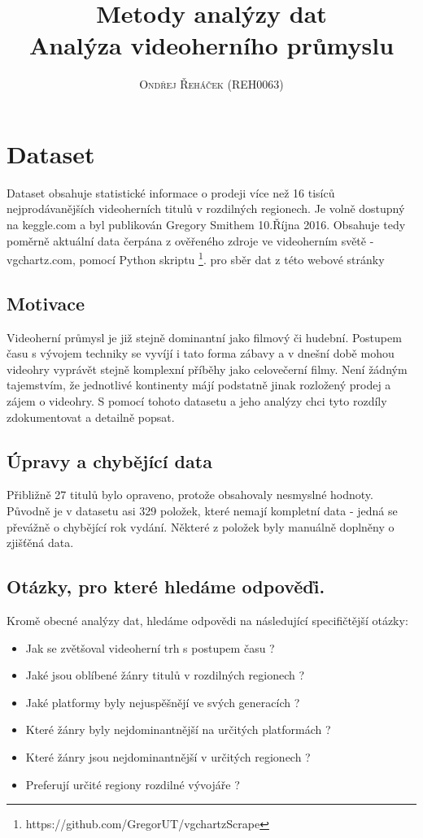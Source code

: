 \documentclass[a4paper,11pt]{article}
\title{\Huge \textbf{Metody analýzy dat}  
\\ \huge Analýza videoherního průmyslu }
\author{\textsc{Ondřej Řeháček (REH0063)}}
\begin{document}
\maketitle

\section{Dataset}
Dataset obsahuje statistické informace o prodeji více než 16 tisíců nejprodávanějších videoherních titulů v rozdilných regionech. Je volně dostupný na keggle.com a byl publikován Gregory Smithem 10.Října 2016. Obsahuje tedy poměrně aktuální data čerpána z ověřeného zdroje ve videoherním světě - vgchartz.com, pomocí Python skriptu \footnote{https://github.com/GregorUT/vgchartzScrape}. pro sběr dat z této webové stránky 

\subsection{Motivace}
Videoherní průmysl je již stejně dominantní jako filmový či hudební. Postupem času s vývojem techniky se vyvíjí i tato forma zábavy a v dnešní době mohou videohry vyprávět stejně komplexní příběhy jako celovečerní filmy. Není žádným tajemstvím, že jednotlivé kontinenty májí podstatně jinak rozložený prodej a zájem o videohry. S pomocí tohoto datasetu a jeho analýzy chci tyto rozdíly zdokumentovat a detailně popsat.


\subsection{Úpravy a chybějící data}
Přibližně 27 titulů bylo opraveno, protože obsahovaly nesmyslné hodnoty. Původně je v datasetu asi 329 položek, které nemají kompletní data - jedná se převážně o chybějící rok vydání. Některé z položek byly manuálně doplněny o zjišťěná data.

\newpage

\subsection{Otázky, pro které hledáme odpověďi.}

Kromě obecné analýzy dat, hledáme odpovědi na následující specifičtější otázky:

\begin{itemize}
\item Jak se zvětšoval videoherní trh s postupem času ?

\item Jaké jsou oblíbené žánry titulů v rozdilných regionech ?

\item Jaké platformy byly nejuspěšnějí ve svých generacích ?

\item Které žánry byly nejdominantnější na určitých platformách ?

\item Které žánry jsou nejdominantnější v určitých regionech ?

\item Preferují určité regiony rozdilné vývojáře ?
\end{itemize}
\end{document}
